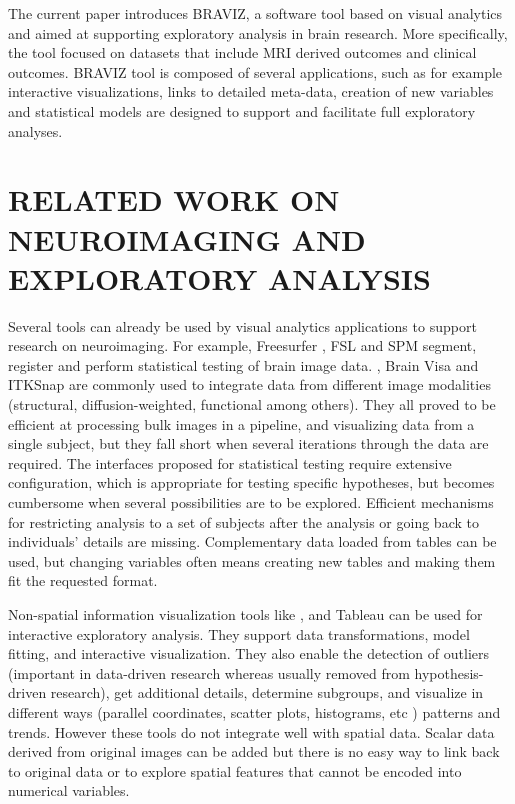 \documentclass[twocolumn]{svjour3} %
\begin{document}
The current paper introduces BRAVIZ, a software tool based on visual analytics and aimed at supporting exploratory analysis in brain research. More specifically, the tool focused on datasets that include MRI derived outcomes and clinical outcomes. BRAVIZ tool is composed of several applications, such as for example interactive visualizations, links to detailed meta-data, creation of new variables and statistical models are designed to support and facilitate full exploratory analyses.  

\section{RELATED WORK ON NEUROIMAGING AND EXPLORATORY ANALYSIS }


Several tools can already be used by visual analytics applications to support research on neuroimaging. For example, Freesurfer \cite{fischl_freesurfer_2012}, FSL \cite{jenkinson_fsl_2012} and SPM \cite{friston_statistical_2006} segment, register and perform statistical testing of brain image data. \cite{fedorov_3d_2012}, Brain Visa \cite{cointepas_brainvisa:_2001} and ITKSnap \cite{yushkevich_user-guided_2006} are commonly used to integrate data from different image modalities (structural, diffusion-weighted, functional among others). They all proved to be efficient at processing bulk images in a pipeline, and visualizing data from a single subject, but they fall short when several iterations through the data are required. The interfaces proposed for statistical testing require extensive configuration, which is appropriate for testing specific hypotheses, but becomes cumbersome when several possibilities are to be explored. Efficient mechanisms for restricting analysis to a set of subjects after the analysis or going back to individuals’ details are missing. Complementary data loaded from tables can be used, but changing variables often means creating new tables and making them fit the requested format.


Non-spatial information visualization tools like \cite{cook_interactive_2007}, and Tableau\cite{hanrahan_tableau_2003} can be used for interactive exploratory analysis. They support data transformations, model fitting, and interactive visualization. They also enable the detection of outliers (important in data-driven research whereas usually removed from hypothesis-driven research), get additional details, determine subgroups, and visualize in different ways (parallel coordinates, scatter plots, histograms, etc ) patterns and trends. However these tools do not integrate well with spatial data. Scalar data derived from original images can be added but there is no easy way to link back to original data or to explore spatial features that cannot be encoded into numerical variables.
\end{document}
